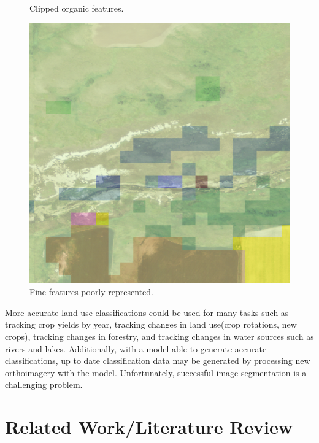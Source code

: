\documentclass[12pt]{article}
\begin{document}
\begin{center}
\begin{figure}[!htb]
      \caption{Clipped organic features.}
    \endminipage\hfill
      \includegraphics[width=\linewidth]{images/poor_labels_3.png}
      \caption{Fine features poorly represented.}   
    \endminipage 
  \end{figure}
\end{center}

\newpage

More accurate land-use classifications could be used for many tasks such as tracking crop yields by year, tracking changes in land use(crop rotations, new crops), tracking changes in forestry, and tracking changes in water sources such as rivers and lakes. Additionally, with a model able to generate accurate classifications, up to date classification data may be generated by processing new orthoimagery with the model. Unfortunately, successful image segmentation is a challenging problem.

\section{Related Work/Literature Review}
\end{document}
